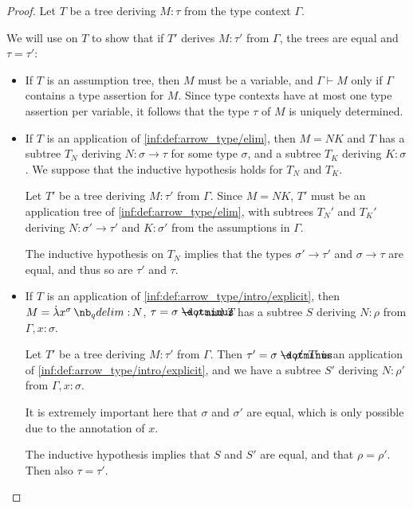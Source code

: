 \begin{proof}
  Let \( T \) be a tree deriving \( M: \tau \) from the type context \( \Gamma \).

  We will use  on \( T \) to show that if \( T' \) derives \( M: \tau' \) from \( \Gamma \), the trees are equal and \( \tau = \tau' \):
  \begin{itemize}
    \item If \( T \) is an assumption tree, then \( M \) must be a variable, and \( \Gamma \vdash M \) only if \( \Gamma \) contains a type assertion for \( M \). Since type contexts have at most one type assertion per variable, it follows that the type \( \tau \) of \( M \) is uniquely determined.

    \item If \( T \) is an application of \ref{inf:def:arrow_type/elim}, then \( M = NK \) and \( T \) has a subtree \( T_N \) deriving \( N: \sigma \to \tau \) for some type \( \sigma \), and a subtree \( T_K \) deriving \( K: \sigma \). We suppose that the inductive hypothesis holds for \( T_N \) and \( T_K \).

    Let \( T' \) be a tree deriving \( M: \tau' \) from \( \Gamma \). Since \( M = NK \), \( T' \) must be an application tree of \ref{inf:def:arrow_type/elim}, with subtrees \( T_N' \) and \( T_K' \) deriving \( N: \sigma' \to \tau' \) and \( K: \sigma' \) from the assumptions in \( \Gamma \).

    The inductive hypothesis on \( T_N \) implies that the types \( \sigma' \to \tau' \) and \( \sigma \to \tau \) are equal, and thus so are \( \tau' \) and \( \tau \).

    \item If \( T \) is an application of \ref{inf:def:arrow_type/intro/explicit}, then \( M = \qabs {x^\sigma} N \), \( \tau = \sigma \synimplies \rho \) and \( T \) has a subtree \( S \) deriving \( N: \rho \) from \( \Gamma, x: \sigma \).

    Let \( T' \) be a tree deriving \( M: \tau' \) from \( \Gamma \). Then \( \tau' = \sigma \synimplies \rho' \) \( T' \) is an application of \ref{inf:def:arrow_type/intro/explicit}, and we have a subtree \( S' \) deriving \( N: \rho' \) from \( \Gamma, x: \sigma \).

    It is extremely important here that \( \sigma \) and \( \sigma' \) are equal, which is only possible due to the annotation of \( x \).

    The inductive hypothesis implies that \( S \) and \( S' \) are equal, and that \( \rho = \rho' \). Then also \( \tau = \tau' \).
  \end{itemize}
\end{proof}

